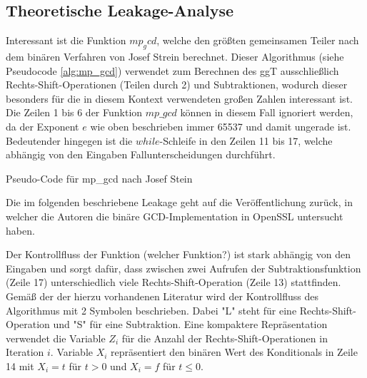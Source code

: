 \subsection{Theoretische Leakage-Analyse}

Interessant ist die Funktion $mp_gcd$, welche den größten gemeinsamen Teiler nach dem binären Verfahren von Josef Strein \cite{SteinBinaryGCD} berechnet. 
Dieser Algorithmus (siehe Pseudocode \ref{alg:mp_gcd}) verwendet zum Berechnen des ggT ausschließlich Rechts-Shift-Operationen (Teilen durch 2) und Subtraktionen, wodurch dieser besonders für die in diesem Kontext verwendeten großen Zahlen interessant ist.
Die Zeilen 1 bis 6 der Funktion $mp\_gcd$ können in diesem Fall ignoriert werden, da der Exponent $e$ wie oben beschrieben immer 65537 und damit ungerade ist. 
Bedeutender hingegen ist die $while$-Schleife in den Zeilen 11 bis 17, welche abhängig von den Eingaben Fallunterscheidungen durchführt. 

\begin{algorithm}[h]
\DontPrintSemicolon
\caption{Pseudo-Code für mp_gcd nach Josef Stein}
\label{alg:mp_gcd}

\end{algorithm}

Die im folgenden beschriebene Leakage geht auf die Veröffentlichung \cite{RSAKeyGeneration2} zurück, in welcher die Autoren die binäre GCD-Implementation in OpenSSL untersucht haben.

Der Kontrollfluss der Funktion (welcher Funktion?) ist stark abhängig von den Eingaben und sorgt dafür, dass zwischen zwei Aufrufen der Subtraktionsfunktion (Zeile 17) unterschiedlich viele Rechts-Shift-Operation (Zeile 13) stattfinden.
Gemäß der der hierzu vorhandenen Literatur wird der Kontrollfluss des Algorithmus mit 2 Symbolen beschrieben.
Dabei "L" steht für eine Rechts-Shift-Operation und "S" für eine Subtraktion.
Eine kompaktere Repräsentation verwendet die Variable $Z_i$ für die Anzahl der Rechts-Shift-Operationen in Iteration $i$.
Variable $X_i$ repräsentiert den binären Wert des Konditionals in Zeile 14 mit $X_i=t$ für $t>0$ und $X_i = f$ für $t \leq 0$.

